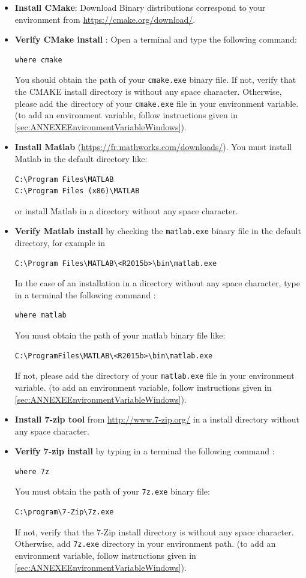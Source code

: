 \begin{itemize}
\item \textbf{Install CMake}: Download Binary distributions correspond to your environment from \url{https://cmake.org/download/}.
\item \textbf{Verify CMake install} : Open a terminal and type the following command:
\begin{lstlisting}
where cmake
\end{lstlisting}
You should obtain the path of your \texttt{cmake.exe} binary file. If not, verify that the CMAKE install directory is without any space character. Otherwise, please add the directory of your \texttt{cmake.exe} file in your environment variable. (to add an environment variable, follow instructions given in \ref{sec:ANNEXEEnvironmentVariableWindows}). 

\item \textbf{Install Matlab} (\url{https://fr.mathworks.com/downloads/}). You must install Matlab in the default directory like:
\begin{lstlisting} 
C:\Program Files\MATLAB
C:\Program Files (x86)\MATLAB
\end{lstlisting}
or install Matlab in a directory without any space character.

\item \textbf{Verify Matlab install} by checking the \texttt{matlab.exe} binary file in the default directory, for example in  
\begin{lstlisting} 
C:\Program Files\MATLAB\<R2015b>\bin\matlab.exe
\end{lstlisting}
In the case of an installation in a directory without any space character, type in a terminal the following command : 
\begin{lstlisting}
where matlab
\end{lstlisting}
You must obtain the path of your matlab binary file like: 
\begin{lstlisting}
C:\ProgramFiles\MATLAB\<R2015b>\bin\matlab.exe
\end{lstlisting}
If not, please add the directory of your \texttt{matlab.exe} file in your environment variable. (to add an environment variable, follow instructions given in \ref{sec:ANNEXEEnvironmentVariableWindows}). 


\item \textbf{Install 7-zip tool} from \url{http://www.7-zip.org/} in a install directory without any space character. 
\item \textbf{Verify 7-zip install} by typing in a terminal the following command : 
\begin{lstlisting}
where 7z
\end{lstlisting}
You must obtain the path of your \texttt{7z.exe} binary file: 
\begin{lstlisting}
C:\program\7-Zip\7z.exe
\end{lstlisting}
If not, verify that the 7-Zip install directory is without any space character. Otherwise, add \texttt{7z.exe} directory in your environment path. 
(to add an environment variable, follow instructions given in \ref{sec:ANNEXEEnvironmentVariableWindows}). 

\end{itemize}



